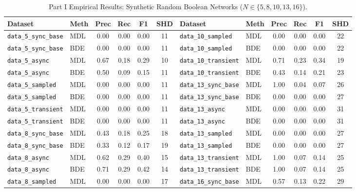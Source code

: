 \documentclass[11pt,a4paper]{article}
\begin{document}
\begin{table}[H]
\centering
\caption{Part I Empirical Results: Synthetic Random Boolean Networks ($N \in \{5, 8, 10, 13, 16\}$).}
\label{tab:part1}
\small
\begin{tabular}{llcccc|llcccc}
\toprule
\textbf{Dataset} & \textbf{Meth} & \textbf{Prec} & \textbf{Rec} & \textbf{F1} & \textbf{SHD} & \textbf{Dataset} & \textbf{Meth} & \textbf{Prec} & \textbf{Rec} & \textbf{F1} & \textbf{SHD} \\
\midrule
\texttt{data\_5\_sync\_base}  & MDL & 0.00 & 0.00 & 0.00 & 11 & \texttt{data\_10\_sampled}    & MDL & 0.00 & 0.00 & 0.00 & 22 \\
\texttt{data\_5\_sync\_base}  & BDE & 0.00 & 0.00 & 0.00 & 11 & \texttt{data\_10\_sampled}    & BDE & 0.00 & 0.00 & 0.00 & 22 \\
\texttt{data\_5\_async}       & MDL & 0.67 & 0.18 & 0.29 & 10 & \texttt{data\_10\_transient}  & MDL & 0.71 & 0.23 & 0.34 & 19 \\
\texttt{data\_5\_async}       & BDE & 0.50 & 0.09 & 0.15 & 11 & \texttt{data\_10\_transient}  & BDE & 0.43 & 0.14 & 0.21 & 23 \\
\texttt{data\_5\_sampled}     & MDL & 0.00 & 0.00 & 0.00 & 11 & \texttt{data\_13\_sync\_base} & MDL & 1.00 & 0.04 & 0.07 & 26 \\
\texttt{data\_5\_sampled}     & BDE & 0.00 & 0.00 & 0.00 & 11 & \texttt{data\_13\_sync\_base} & BDE & 0.00 & 0.00 & 0.00 & 27 \\
\texttt{data\_5\_transient}   & MDL & 0.00 & 0.00 & 0.00 & 11 & \texttt{data\_13\_async}      & MDL & 0.00 & 0.00 & 0.00 & 31 \\
\texttt{data\_5\_transient}   & BDE & 0.00 & 0.00 & 0.00 & 11 & \texttt{data\_13\_async}      & BDE & 0.00 & 0.00 & 0.00 & 31 \\
\texttt{data\_8\_sync\_base}  & MDL & 0.43 & 0.18 & 0.25 & 18 & \texttt{data\_13\_sampled}    & MDL & 0.00 & 0.00 & 0.00 & 27 \\
\texttt{data\_8\_sync\_base}  & BDE & 0.33 & 0.12 & 0.17 & 19 & \texttt{data\_13\_sampled}    & BDE & 0.00 & 0.00 & 0.00 & 27 \\
\texttt{data\_8\_async}       & MDL & 0.62 & 0.29 & 0.40 & 15 & \texttt{data\_13\_transient}  & MDL & 1.00 & 0.07 & 0.14 & 25 \\
\texttt{data\_8\_async}       & BDE & 0.71 & 0.29 & 0.42 & 14 & \texttt{data\_13\_transient}  & BDE & 1.00 & 0.07 & 0.14 & 25 \\
\texttt{data\_8\_sampled}     & MDL & 0.00 & 0.00 & 0.00 & 17 & \texttt{data\_16\_sync\_base} & MDL & 0.57 & 0.13 & 0.22 & 29 \\

\end{tabular}
\end{table}
\end{document}
